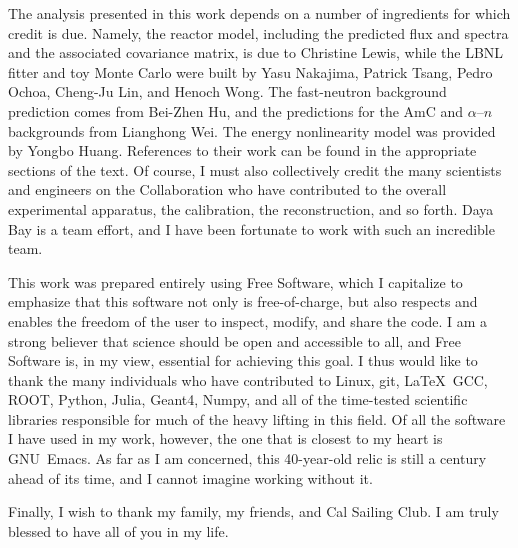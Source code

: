 \documentclass[../thesis.tex]{subfiles}
\begin{document}
The analysis presented in this work depends on a number of ingredients for which credit is due. Namely, the reactor model, including the predicted flux and spectra and the associated covariance matrix, is due to Christine Lewis, while the LBNL fitter and toy Monte Carlo were built by Yasu Nakajima, Patrick Tsang, Pedro Ochoa, Cheng-Ju Lin, and Henoch Wong. The fast-neutron background prediction comes from Bei-Zhen Hu, and the predictions for the AmC and $\alpha$--$n$ backgrounds from Lianghong Wei. The energy nonlinearity model was provided by Yongbo Huang. References to their work can be found in the appropriate sections of the text. Of course, I must also collectively credit the many scientists and engineers on the Collaboration who have contributed to the overall experimental apparatus, the calibration, the reconstruction, and so forth. Daya Bay is a team effort, and I have been fortunate to work with such an incredible team.

This work was prepared entirely using Free Software, which I capitalize to emphasize that this software not only is free-of-charge, but also respects and enables the freedom of the user to inspect, modify, and share the code. I am a strong believer that science should be open and accessible to all, and Free Software is, in my view, essential for achieving this goal. I thus would like to thank the many individuals who have contributed to Linux, git, \LaTeX\, GCC, ROOT, Python, Julia, Geant4, Numpy, and all of the time-tested scientific libraries responsible for much of the heavy lifting in this field. Of all the software I have used in my work, however, the one that is closest to my heart is GNU~Emacs. As far as I am concerned, this 40-year-old relic is still a century ahead of its time, and I cannot imagine working without it.

Finally, I wish to thank my family, my friends, and Cal Sailing Club. I am truly blessed to have all of you in my life.
\end{document}
